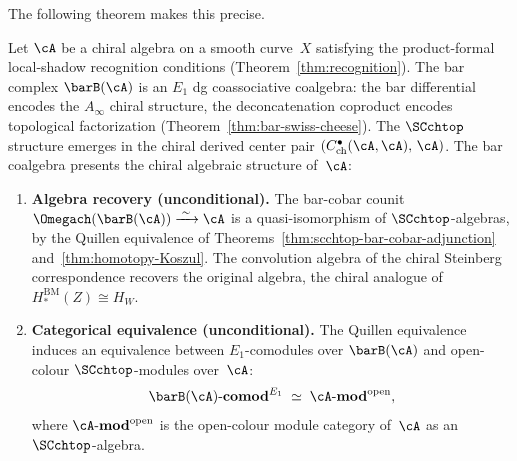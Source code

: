 The following theorem makes this precise.

\begin{theorem}
\label{thm:steinberg-presentation}
Let\/ $\cA$ be a chiral algebra on a smooth curve~$X$ satisfying the
product-formal local-shadow recognition conditions
\textup{(}Theorem~\textup{\ref{thm:recognition})}.
The bar complex $\barB(\cA)$ is an $E_1$ dg coassociative
coalgebra: the bar differential encodes the $A_\infty$ chiral
structure, the deconcatenation coproduct encodes topological
factorization
\textup{(}Theorem~\textup{\ref{thm:bar-swiss-cheese})}.
The $\SCchtop$ structure emerges in the chiral derived center
pair $(C^\bullet_{\mathrm{ch}}(\cA,\cA),\, \cA)$.
The bar coalgebra
presents the chiral algebraic structure of\/~$\cA$:
\begin{enumerate}[label=\textup{(\roman*)}]
\item \textbf{Algebra recovery \textup{(}unconditional\textup{)}.}
 The bar-cobar counit
 $\Omegach(\barB(\cA)) \xrightarrow{\;\sim\;} \cA$
 is a quasi-isomorphism of $\SCchtop$-algebras, by the
 Quillen equivalence of
 Theorems~\textup{\ref{thm:scchtop-bar-cobar-adjunction}}
 and~\textup{\ref{thm:homotopy-Koszul}}.
 The convolution algebra of the chiral Steinberg correspondence
 recovers the original algebra, the chiral analogue of
 $H_\ast^{\mathrm{BM}}(Z) \cong H_W$.

\item \textbf{Categorical equivalence
 \textup{(}unconditional\textup{)}.}
 The Quillen equivalence induces an equivalence between
 $E_1$-comodules over $\barB(\cA)$ and
 open-colour $\SCchtop$-modules over~$\cA$:
 \[
 \barB(\cA)\textup{-}\mathbf{comod}^{E_1}
 \;\simeq\;
 \cA\textup{-}\mathbf{mod}^{\mathrm{open}},
 \]
 where $\cA\textup{-}\mathbf{mod}^{\mathrm{open}}$ is the
 open-colour module category of~$\cA$ as an
 $\SCchtop$-algebra.


\end{enumerate}
\end{theorem}
